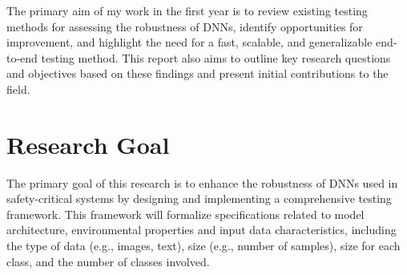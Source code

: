 \begin{tcolorbox}[colback=purple!2!white, colframe=purple,title= 10\textsuperscript{th} Month Report Goal]

    The primary aim of my work in the first year is to review existing testing methods for assessing the robustness of DNNs, identify opportunities for improvement, and highlight the need for a fast, scalable, and generalizable end-to-end testing method. This report also aims to outline key research questions and objectives based on these findings and present initial contributions to the field.

\end{tcolorbox}
    



\section{Research Goal}

The primary goal of this research is to enhance the robustness of DNNs used in safety-critical systems by designing and implementing a comprehensive testing framework. This framework will formalize specifications related to model architecture, environmental properties and input data characteristics, including the type of data (e.g., images, text), size (e.g., number of samples), size for each class, and the number of classes involved.

